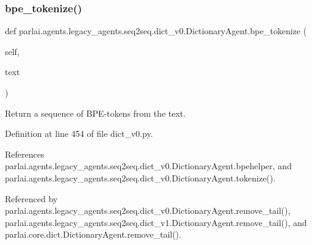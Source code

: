 \subsubsection{\texorpdfstring{bpe\+\_\+tokenize()}{bpe\_tokenize()}}
{\footnotesize\ttfamily def parlai.\+agents.\+legacy\+\_\+agents.\+seq2seq.\+dict\+\_\+v0.\+Dictionary\+Agent.\+bpe\+\_\+tokenize (\begin{DoxyParamCaption}\item[{}]{self,  }\item[{}]{text }\end{DoxyParamCaption})}

\begin{DoxyVerb}Return a sequence of BPE-tokens from the text.\end{DoxyVerb}
 

Definition at line 454 of file dict\+\_\+v0.\+py.



References parlai.\+agents.\+legacy\+\_\+agents.\+seq2seq.\+dict\+\_\+v0.\+Dictionary\+Agent.\+bpehelper, and parlai.\+agents.\+legacy\+\_\+agents.\+seq2seq.\+dict\+\_\+v0.\+Dictionary\+Agent.\+tokenize().



Referenced by parlai.\+agents.\+legacy\+\_\+agents.\+seq2seq.\+dict\+\_\+v0.\+Dictionary\+Agent.\+remove\+\_\+tail(), parlai.\+agents.\+legacy\+\_\+agents.\+seq2seq.\+dict\+\_\+v1.\+Dictionary\+Agent.\+remove\+\_\+tail(), and parlai.\+core.\+dict.\+Dictionary\+Agent.\+remove\+\_\+tail().

